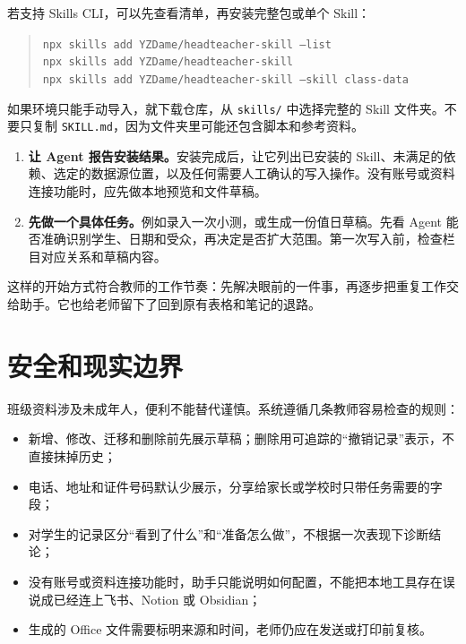 \documentclass[11pt,a4paper,fontset=none]{ctexart}
\begin{document}
若支持 Skills CLI，可以先查看清单，再安装完整包或单个 Skill：

\begin{quote}
\texttt{npx skills add YZDame/headteacher-skill --list}\\
\texttt{npx skills add YZDame/headteacher-skill}\\
\texttt{npx skills add YZDame/headteacher-skill --skill class-data}
\end{quote}

如果环境只能手动导入，就下载仓库，从 \texttt{skills/} 中选择完整的 Skill 文件夹。不要只复制 \texttt{SKILL.md}，因为文件夹里可能还包含脚本和参考资料。

\begin{enumerate}[resume]
  \item \textbf{让 Agent 报告安装结果。}安装完成后，让它列出已安装的 Skill、未满足的依赖、选定的数据源位置，以及任何需要人工确认的写入操作。没有账号或资料连接功能时，应先做本地预览和文件草稿。
  \item \textbf{先做一个具体任务。}例如录入一次小测，或生成一份值日草稿。先看 Agent 能否准确识别学生、日期和受众，再决定是否扩大范围。第一次写入前，检查栏目对应关系和草稿内容。
\end{enumerate}

这样的开始方式符合教师的工作节奏：先解决眼前的一件事，再逐步把重复工作交给助手。它也给老师留下了回到原有表格和笔记的退路。

\section{安全和现实边界}

班级资料涉及未成年人，便利不能替代谨慎。系统遵循几条教师容易检查的规则：

\begin{itemize}
  \item 新增、修改、迁移和删除前先展示草稿；删除用可追踪的“撤销记录”表示，不直接抹掉历史；
  \item 电话、地址和证件号码默认少展示，分享给家长或学校时只带任务需要的字段；
  \item 对学生的记录区分“看到了什么”和“准备怎么做”，不根据一次表现下诊断结论；
  \item 没有账号或资料连接功能时，助手只能说明如何配置，不能把本地工具存在误说成已经连上飞书、Notion 或 Obsidian；
  \item 生成的 Office 文件需要标明来源和时间，老师仍应在发送或打印前复核。
\end{itemize}
\end{document}
